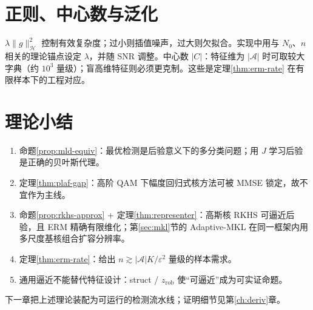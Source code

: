 \begin{center}
\end{center}

\section{正则、中心数与泛化}

$\lambda\|g\|_{\mathcal{H}}^2$ 控制有效复杂度；过小则插值噪声，过大则欠拟合。实现中用与 $N_0$、$n$ 相关的理论锚点设定 $\lambda$，并随 SNR 调整。中心数 $|C|$：特征维为 $|\mathcal{A}|$ 时可取较大字典（约 $10^3$ 量级）；盲高维特征则必须更克制。这些是定理\ref{thm:erm-rate} 在有限样本下的工程对应。

\section{理论小结}

\begin{enumerate}[leftmargin=2em]
  \item 命题\ref{prop:mld-equiv}：最优检测是后验意义下的多分类问题；用 $J$ 学习后验是正确的贝叶斯代理。
  \item 定理\ref{thm:plaf-gap}：高阶 QAM 下幅度回归式核方法可被 MMSE 锁定，故不宜作为主线。
  \item 命题\ref{prop:rkhs-approx} + 定理\ref{thm:representer}：高斯核 RKHS 可逼近后验，且 ERM 精确有限维化；第\ref{sec:mkl}节的 Adaptive-MKL 在同一框架内用多尺度基核组合扩容分辨率。
  \item 定理\ref{thm:erm-rate}：给出 $n\gtrsim|\mathcal{A}|K/\varepsilon^2$ 量级的样本需求。
  \item 通用逼近不能替代特征设计：struct / $z_{\mathrm{rob}}$ 使“可逼近”成为可实证命题。
\end{enumerate}
下一章把上述理论装配为可运行的检测流水线；证明细节见第\ref{ch:deriv}章。
